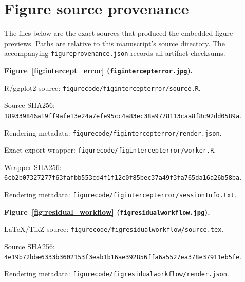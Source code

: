 \documentclass[11pt]{article}
\begin{document}



\clearpage
\section*{Figure source provenance}
The files below are the exact sources that produced the embedded figure previews. Paths are relative to this manuscript's source directory. The accompanying \texttt{figureprovenance.json} records all artifact checksums.\par
\medskip\noindent\textbf{Figure~\ref{fig:intercept_error} (\texttt{figintercepterror.jpg}).}\par
\noindent R/ggplot2 source: \texttt{figurecode/\allowbreak{}figintercepterror/\allowbreak{}source.R}.\par
\noindent Source SHA256: \texttt{18933984\allowbreak{}6a19ff9a\allowbreak{}fe13e24a\allowbreak{}7efe95cc\allowbreak{}4a83ec38\allowbreak{}a9778113\allowbreak{}caa8f8c9\allowbreak{}2dd0589a}.\par
\noindent Rendering metadata: \texttt{figurecode/\allowbreak{}figintercepterror/\allowbreak{}render.json}.\par
\noindent Exact export wrapper: \texttt{figurecode/\allowbreak{}figintercepterror/\allowbreak{}worker.R}.\par
\noindent Wrapper SHA256: \texttt{6cb2b073\allowbreak{}27277f63\allowbreak{}fafbb553\allowbreak{}cd4f1f12\allowbreak{}c0f85bec\allowbreak{}37a49f3f\allowbreak{}a765da16\allowbreak{}a26b58ba}.\par
\noindent Rendering metadata: \texttt{figurecode/\allowbreak{}figintercepterror/\allowbreak{}sessionInfo.txt}.\par
\medskip\noindent\textbf{Figure~\ref{fig:residual_workflow} (\texttt{figresidualworkflow.jpg}).}\par
\noindent LaTeX/TikZ source: \texttt{figurecode/\allowbreak{}figresidualworkflow/\allowbreak{}source.tex}.\par
\noindent Source SHA256: \texttt{4e19b72b\allowbreak{}be6333b3\allowbreak{}602153f3\allowbreak{}eab1b16a\allowbreak{}e392856f\allowbreak{}fa6a5527\allowbreak{}ea378e37\allowbreak{}911eb5fe}.\par
\noindent Rendering metadata: \texttt{figurecode/\allowbreak{}figresidualworkflow/\allowbreak{}render.json}.\par
\end{document}
